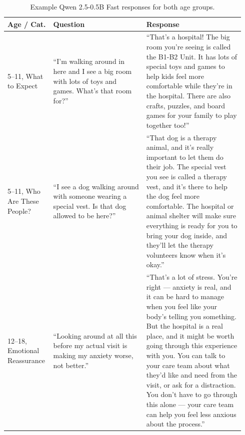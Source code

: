 \documentclass[ASNA,twocolumn]{USG} %
\begin{document}
\setcounter{table}{0}
\begin{table}[!b]
  \centering
  \caption{Example Qwen 2.5-0.5B Fast responses for both age groups.}
  \label{tab:examples}
  \footnotesize
  \begin{tabular}{p{0.16\linewidth}p{0.38\linewidth}p{0.40\linewidth}}
    \hline
    Age / Cat. & Question & Response \\
    \hline
    5--11, What to Expect &
    ``I'm walking around in here and I see a big room with lots of toys and games. What's that room for?'' &
    ``That's a hospital! The big room you're seeing is called the B1-B2 Unit. It has lots of special toys and games to help kids feel more comfortable while they're in the hospital. There are also crafts, puzzles, and board games for your family to play together too!'' \\
    5--11, Who Are These People? &
    ``I see a dog walking around with someone wearing a special vest. Is that dog allowed to be here?'' &
    ``That dog is a therapy animal, and it's really important to let them do their job. The special vest you see is called a therapy vest, and it's there to help the dog feel more comfortable. The hospital or animal shelter will make sure everything is ready for you to bring your dog inside, and they'll let the therapy volunteers know when it's okay.'' \\
    12--18, Emotional Reassurance &
    ``Looking around at all this before my actual visit is making my anxiety worse, not better.'' &
    ``That's a lot of stress. You're right --- anxiety is real, and it can be hard to manage when you feel like your body's telling you something. But the hospital is a real place, and it might be worth going through this experience with you. You can talk to your care team about what they'd like and need from the visit, or ask for a distraction. You don't have to go through this alone --- your care team can help you feel less anxious about the process.'' \\
    \hline
  \end{tabular}
\end{table}
\setcounter{table}{7}
\end{document}
